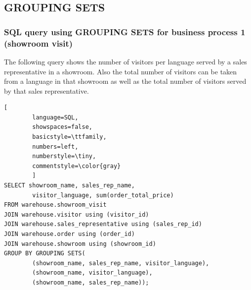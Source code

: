\documentclass[letterpaper,12pt]{article}
\begin{document}
\subsection{GROUPING SETS}

\subsubsection{SQL query using GROUPING SETS for business process 1 (showroom visit)}

The following query shows the number of visitors per language served by a sales representative in a showroom. Also the total number of visitors can be taken from a language in that showroom as well as the total number of visitors served by that sales representative.

\begin{lstlisting}[
        language=SQL,
        showspaces=false,
        basicstyle=\ttfamily,
        numbers=left,
        numberstyle=\tiny,
        commentstyle=\color{gray}
        ]
SELECT showroom_name, sales_rep_name, 
        visitor_language, sum(order_total_price)
FROM warehouse.showroom_visit
JOIN warehouse.visitor using (visitor_id)
JOIN warehouse.sales_representative using (sales_rep_id)
JOIN warehouse.order using (order_id)
JOIN warehouse.showroom using (showroom_id)
GROUP BY GROUPING SETS(
        (showroom_name, sales_rep_name, visitor_language),
        (showroom_name, visitor_language),
        (showroom_name, sales_rep_name));
\end{lstlisting} 
\end{document}
